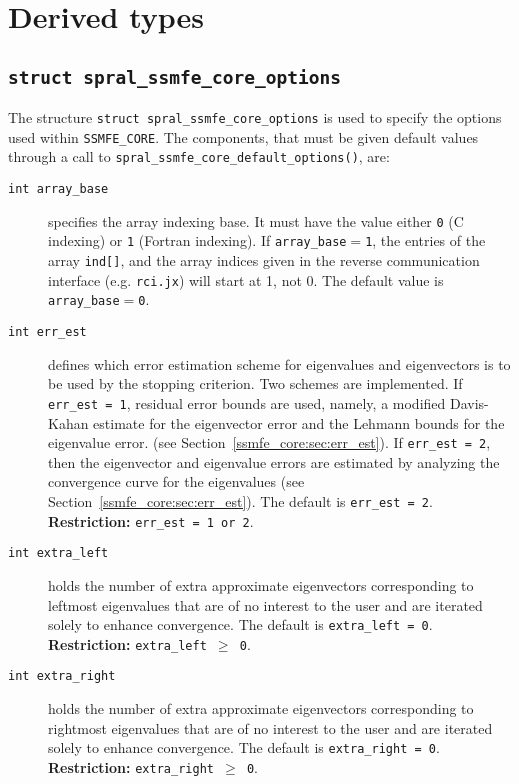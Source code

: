 \section{Derived types}
\subsection{\texttt{struct spral\_ssmfe\_core\_options}} \label{ssmfe_core:type:options}

The structure {\tt struct spral\_ssmfe\_core\_options} is used to specify
the options used within {\tt SSMFE\_CORE}. The components, that must be given
default values through a call to \texttt{spral\_ssmfe\_core\_default\_options()}, are:

\begin{description}
%
\item[\texttt{int array\_base}] specifies the array indexing base. It must
   have the value either \texttt{0} (C indexing) or \texttt{1} (Fortran
   indexing). If \texttt{array\_base}$=$\texttt{1}, the entries of the array
   \texttt{ind[]}, and the array indices given in the reverse communication
   interface (e.g. \texttt{rci.jx}) will start at 1, not 0.
   The default value is \texttt{array\_base}$=$\texttt{0}.
%
\item[\texttt{int err\_est}] 
defines which error estimation scheme 
for eigenvalues and eigenvectors
is to be used by the stopping criterion.
Two schemes are implemented.
If {\tt err\_est = 1}, residual error bounds are used,
namely,
a modified Davis-Kahan estimate for the eigenvector error
and
the Lehmann bounds for the eigenvalue error.
(see Section~\ref{ssmfe_core:sec:err_est}).
If {\tt err\_est = 2}, 
then the eigenvector and eigenvalue errors
are estimated by analyzing the convergence curve
for the eigenvalues (see Section~\ref{ssmfe_core:sec:err_est}).
The default is {\tt err\_est = 2}.
{\bf Restriction:} {\tt err\_est = 1 {\rm or} 2}.
%
\item[\texttt{int extra\_left}]
holds the number of extra approximate eigenvectors
corresponding to leftmost eigenvalues
that are of no interest to the user
and are iterated solely to enhance convergence.
The default is {\tt extra\_left = 0}.
{\bf Restriction:} {\tt extra\_left $\ge$ 0}.
%
\item[\texttt{int extra\_right}]
holds the number of extra approximate eigenvectors
corresponding to rightmost eigenvalues
that are of no interest to the user
and are iterated solely to enhance convergence.
The default is {\tt extra\_right = 0}.
{\bf Restriction:} {\tt extra\_right $\ge$ 0}.

\end{description}
